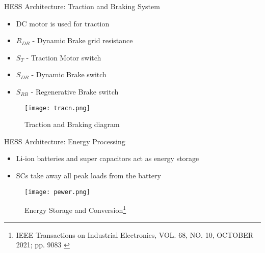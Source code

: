 \documentclass[aspectratio=169]{beamer}
\begin{document}
\begin{frame}{HESS Architecture: Traction and Braking System}
	\begin{minipage}{0.5\textwidth}
		
		\begin{itemize}
			
			\item DC motor is used for traction
			\item $R_{DB}$ - Dynamic Brake grid resistance
			\item $S_{T}$ - Traction Motor switch
			\item $S_{DB}$ - Dynamic Brake switch
			\item $S_{RB}$ - Regenerative Brake switch
		\end{itemize} 
	\end{minipage}
	\begin{minipage}{0.3\textwidth}
		
		\begin{figure}
			\texttt{[image: tracn.png]}
			\begin{center}
			\caption{Traction and Braking diagram}
		\end{center}
			\label{fig:trac2}
			
		\end{figure}
	
	\end{minipage}
\end{frame}




\begin{frame}{HESS Architecture: Energy Processing}

		\begin{itemize}
			
			\item Li-ion batteries and super capacitors act as energy storage
			\item SCs take away all peak loads from the battery

		\end{itemize} 


		\begin{figure}
			\texttt{[image: pewer.png]}
			\caption{Energy Storage and Conversion\footnote{IEEE Transactions on Industrial Electronics, VOL. 68, NO. 10, OCTOBER 2021; pp. 9083
					\cite{p1}	}}
			\label{fig:ss42}
			
		\end{figure}

\end{frame}
\end{document}
